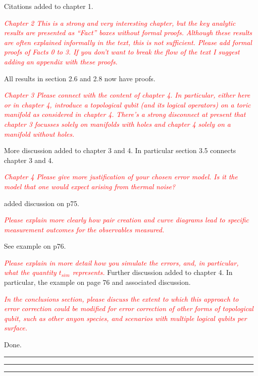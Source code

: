 \documentclass[11pt,oneside]{article}
\newcommand{\danbrowne}[1]{\vspace{10pt}\noindent\textcolor{red}{{\it #1}}}
\begin{document}
Citations added to chapter 1.

\danbrowne{
Chapter 2
This is a strong and very interesting chapter, but the key analytic results are presented as “Fact” boxes without formal proofs.
Although these results are often explained informally in the text, this is not sufficient. Please add formal proofs of Facts 0 to 3. If
you don’t want to break the flow of the text I suggest adding an appendix with these proofs.
}

All results in section 2.6 and 2.8 now have proofs.

\danbrowne{
Chapter 3
Please connect with the content of chapter 4. In particular, either here or in chapter 4, introduce a topological qubit (and its logical
operators) on a toric manifold as considered in chapter 4. There’s a strong disconnect at present that chapter 3 focusses solely on
manifolds with holes and chapter 4 solely on a manifold without holes.
}

More discussion added to chapter 3 and 4.
In particular section 3.5 connects chapter 3 and 4.

\danbrowne{
Chapter 4
Please give more justification of your chosen error model.
Is it the model that one would expect arising from thermal noise?}

added discussion on p75.

\danbrowne{Please explain more clearly how pair creation and curve
diagrams lead to specific measurement outcomes for the observables
measured.}

See example on p76.

\danbrowne{
Please explain in more detail how you simulate the errors,
and, in particular, what the quantity $t_{sim}$ represents.
}
Further discussion added to chapter 4.
In particular, the example on page 76 and associated discussion.

\danbrowne{
In the conclusions section, please discuss the extent
to which this approach to error correction could be modified for error
correction of other forms of topological qubit, such
as other anyon species, and scenarios with multiple logical qubits per surface.
}

Done.

\vspace{10pt}
\hrule
\hrule
\hrule
\end{document}
